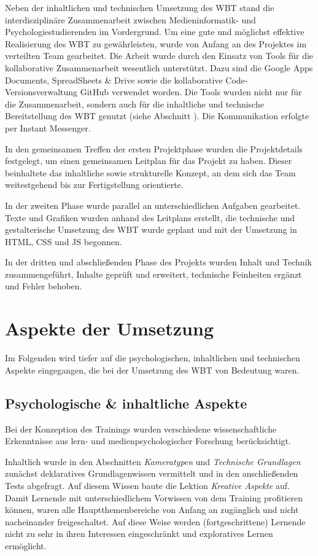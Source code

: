 \documentclass{article}
\begin{document}
Neben der inhaltlichen und technischen Umsetzung des WBT stand die interdisziplin\"are Zusammenarbeit zwischen Medieninformatik- und Psychologiestudierenden im Vordergrund. Um eine gute und m\"oglichst effektive Realisierung des WBT zu gew\"ahrleisten, wurde von Anfang an des Projektes im verteilten Team gearbeitet. Die Arbeit wurde durch den Einsatz von Tools f\"ur die kollaborative Zusammenarbeit wesentlich unterst\"utzt. Dazu sind die Google\textsuperscript{\textcopyright} Apps Documents, SpreadSheets \& Drive sowie die kollaborative Code-Versionsverwaltung GitHub verwendet worden. Die Tools wurden nicht nur f\"ur die Zusammenarbeit, sondern auch f\"ur die inhaltliche und technische Bereitstellung des WBT genutzt (siehe Abschnitt ). Die Kommunikation erfolgte per Instant Messenger.

In den gemeinsamen Treffen der ersten Projektphase wurden die Projektdetails festgelegt, um einen gemeinsamen Leitplan f\"ur das Projekt zu haben. Dieser beinhaltete das inhaltliche sowie strukturelle Konzept, an dem sich das Team weitestgehend bis zur Fertigstellung orientierte.

In der zweiten Phase wurde parallel an unterschiedlichen Aufgaben gearbeitet. Texte und Grafiken wurden anhand des Leitplans erstellt, die technische und gestalterische Umsetzung des WBT wurde geplant und mit der Umsetzung in HTML, CSS und JS begonnen.

In der dritten und abschlie{\ss}enden Phase des Projekts wurden Inhalt und Technik zusammengef\"uhrt, Inhalte gepr\"uft und erweitert, technische Feinheiten erg\"anzt und Fehler behoben.

\section{Aspekte der Umsetzung}
\label{sec:umsetzung}
Im Folgenden wird tiefer auf die psychologischen, inhaltlichen und technischen Aspekte eingegangen, die bei der Umsetzung des WBT von Bedeutung waren. 

\subsection{Psychologische \& inhaltliche Aspekte}
\label{ssec:psy}
Bei der Konzeption des Trainings wurden verschiedene wissenschaftliche Erkenntnisse aus lern- und medienpsychologischer Forschung ber\"ucksichtigt.

Inhaltlich wurde in den Abschnitten \emph{Kameratypen} und \emph{Technische Grundlagen} zun\"achst deklaratives Grundlagenwissen vermittelt und in den anschlie{\ss}enden Tests abgefragt. Auf diesem Wissen baute die Lektion \emph{Kreative Aspekte} auf. Damit Lernende mit unterschiedlichem Vorwissen von dem Training profitieren k\"onnen, waren alle Hauptthemenbereiche von Anfang an zug\"anglich und nicht nacheinander freigeschaltet. Auf diese Weise werden (fortgeschrittene) Lernende nicht zu sehr in ihren Interessen eingeschr\"ankt und exploratives Lernen erm\"oglicht.
\end{document}

